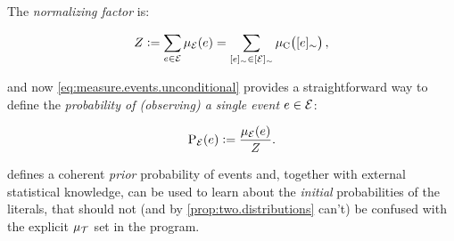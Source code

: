 \documentclass{tlp}
\newcommand{\at}[1]{\ensuremath{\!\del{#1}}}        %
\newcommand{\cla}[1]{\ensuremath{{\cal #1}}}        %
\newcommand{\TCHOICEset}{\ensuremath{\cla{T}}}
\newcommand{\EVENTSset}{\ensuremath{\cla{E}}}
\newcommand{\prfunc}{\ensuremath{\mathrm{P}}}
\newcommand{\prd}[1]{\ensuremath{\prfunc_{#1}}}
\newcommand{\prE}{\prd{\EVENTSset}}
\newcommand{\pwT}{\ensuremath{\mu_{\TCHOICEset}}}
\newcommand{\pwC}{\ensuremath{\mu_{\textrm{C}}}}
\newcommand{\pwc}[1]{\ensuremath{\pwC\at{#1}}}
\newcommand{\pwE}{\ensuremath{\mu_{\EVENTSset}}}
\newcommand{\pwe}[1]{\ensuremath{\pwE\at{#1}}}
\newcommand{\class}[1]{\ensuremath{[{#1}]_{\sim}}}
\begin{document}
The \emph{normalizing factor} is:

\begin{equation}
    Z :=
    \sum_{e \in \EVENTSset} \pwe{e} =
    \sum_{\class{e} \in \class{\EVENTSset}} \pwc{\class{e}},\label{eq:normalizing.factor}
\end{equation}

and now \cref{eq:measure.events.unconditional} provides a
straightforward way to define the \emph{probability of (observing) a
  single event $e \in \EVENTSset$}:

\begin{equation}
    \prE\at{e} := \frac{\pwe{e}}{Z}.\label{eq:probability.event}
\end{equation}

 defines a coherent \emph{prior}
probability of events and, together with external statistical
knowledge, can be used to learn about the \emph{initial} probabilities
of the literals, that should not (and by \cref{prop:two.distributions}
can't) be confused with the explicit \(\pwT\) set in the program.
\end{document}
